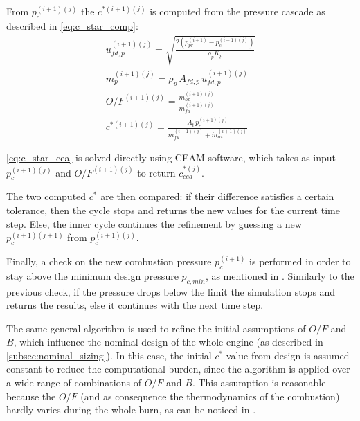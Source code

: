 From $p_c ^ {(i+1)(j)}$ the $c^{*(i+1)(j)}$ is computed from the pressure cascade as described in \autoref{eq:c_star_comp}:
\begin{gather}
    u_{fd,p} ^ {(i+1)(j)} = \sqrt{\frac{2 \left( p_{pr} ^ {(i+1)} - p_c ^ {(i+1)(j)} \right)}{\rho_p K_p}}
    \\[3pt]
    m_p ^ {(i+1)(j)} = \rho_p \, A_{fd,p} \, u_{fd,p} ^ {(i+1)(j)}
    \\[3pt]
    O/F ^ {(i+1)(j)} = \frac{m_{ox} ^ {(i+1)(j)}}{m_{fu} ^ {(i+1)(j)}}
    \\[3pt]
    c^{*(i+1)(j)} = \frac{A_t \, p_c ^ {(i+1)(j)}}{\dot{m}_{fu} ^ {(i+1)(j)} + \dot{m}_{ox} ^ {(i+1)(j)}}
\end{gather}

\autoref{eq:c_star_cea} is solved directly using CEAM software, which takes as input $p_c ^ {(i+1)(j)}$ and $O/F ^ {(i+1)(j)}$ to return $c_{cea}^{*(j)}$.

The two computed $c^*$ are then compared: if their difference satisfies a certain tolerance, then the cycle stops and returns the new values for the current time step. Else, the inner cycle continues the refinement by guessing a new $p_c ^ {(i+1)(j+1)}$ from $p_c ^ {(i+1)(j)}$.

Finally, a check on the new combustion pressure $p_c ^ {(i+1)}$ is performed in order to stay above the minimum design pressure $p_{c,min}$, as mentioned in \mref. Similarly to the previous check, if the pressure drops below the limit the simulation stops and returns the results, else it continues with the next time step.

\vspace*{3mm}

The same general algorithm is used to refine the initial assumptions of $O/F$ and $B$, which influence the nominal design of the whole engine (as described in \autoref{subsec:nominal_sizing}).
In this case, the initial $c^*$ value from design is assumed constant to reduce the computational burden, since the algorithm is applied over a wide range of combinations of $O/F$ and $B$. This assumption is reasonable because the $O/F$ (and as consequence the thermodynamics of the combustion) hardly varies during the whole burn, as can be noticed in \mref.